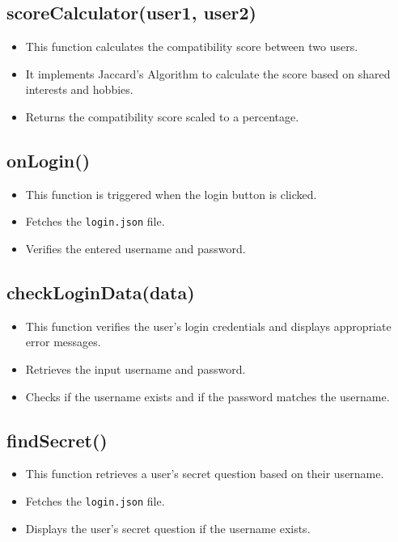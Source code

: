 \documentclass[12pt,a4paper]{article}
\begin{document}
\subsection{scoreCalculator(user1, user2)}
\begin{itemize}
    \item This function calculates the compatibility score between two users.
    \item It implements Jaccard's Algorithm to calculate the score based on shared interests and hobbies.
    \item Returns the compatibility score scaled to a percentage.
\end{itemize}

\subsection{onLogin()}
\begin{itemize}
    \item This function is triggered when the login button is clicked.
    \item Fetches the \texttt{login.json} file.
    \item Verifies the entered username and password.
\end{itemize}

\subsection{checkLoginData(data)}
\begin{itemize}
    \item This function verifies the user's login credentials and displays appropriate error messages.
    \item Retrieves the input username and password.
    \item Checks if the username exists and if the password matches the username.
\end{itemize}

\subsection{findSecret()}
\begin{itemize}
    \item This function retrieves a user's secret question based on their username.
    \item Fetches the \texttt{login.json} file.
    \item Displays the user's secret question if the username exists.
\end{itemize}
\end{document}
